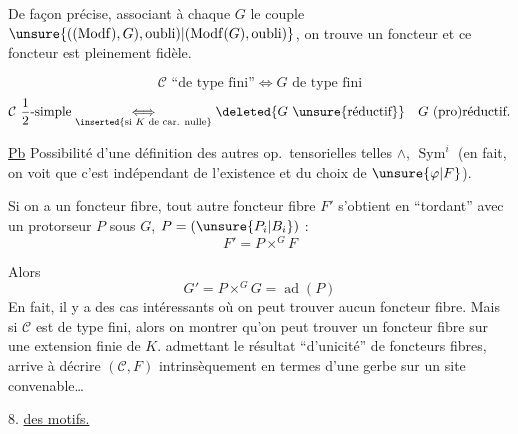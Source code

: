 De façon précise, associant à chaque $G$ le couple $\unsure{((\operatorname{Modf}),G),\mathrm{oubli})|(\operatorname{Modf}(G),\mathrm{oubli})}$, on trouve un foncteur
et ce foncteur est pleinement fidèle.

\[
\mathcal C\text{ ``de type fini''}\Longleftrightarrow G\text{ de type fini}
\]
\[
\mathcal C\text{ $\frac12$-simple}
\underset{\inserted{\text{si }K\text{ de car. nulle}}}{\Longleftrightarrow}
\deleted{G\text{ \unsure{réductif}}}\quad G\text{ (pro)réductif}.
\]

\uline{Pb} Possibilité d'une définition des autres op.\ tensorielles telles $\wedge$, $\operatorname{Sym}^i$ (en fait, on voit que c'est indépendant de l'existence et du choix de $\unsure{\varphi|F}$).

Si on a un foncteur fibre, tout autre foncteur fibre $F'$ s'obtient en ``tordant'' avec un protorseur $P$ sous $G$, $P=(\unsure{P_i|B_i})$ :
\[
F'=P\times^G F
\]

Alors
\[
G'=P\times^G G=\operatorname{ad}(P)
\]
En fait, il y a des cas intéressants où  on peut trouver aucun foncteur fibre. Mais si $\mathcal C$ est de type fini, alors on  montrer qu'on peut trouver un foncteur fibre sur une extension finie de $K$.
admettant le résultat ``d'unicité'' de foncteurs fibres,  arrive à décrire $(\mathcal C,F)$ intrinsèquement en termes d'une gerbe sur un site convenable\dots

8. \uline{ des motifs.}

